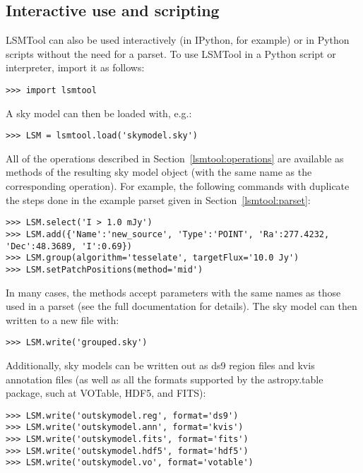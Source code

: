 \documentclass[structabstract]{article}
\begin{document}
\subsection{Interactive use and scripting}
\label{lsmtool:scripting}
LSMTool can also be used interactively (in IPython, for example) or in Python scripts without the need for a parset. To use LSMTool in a Python script or interpreter, import it as follows:
\begin{verbatim}
>>> import lsmtool
\end{verbatim}
A sky model can then be loaded with, e.g.:
\begin{verbatim}
>>> LSM = lsmtool.load('skymodel.sky')
\end{verbatim}
All of the operations described in Section~\ref{lsmtool:operations} are available as methods of the resulting sky model object (with the same name as the corresponding operation). For example, the following commands with duplicate the steps done in the example parset given in Section~\ref{lsmtool:parset}:
\begin{verbatim}
>>> LSM.select('I > 1.0 mJy')
>>> LSM.add({'Name':'new_source', 'Type':'POINT', 'Ra':277.4232, 'Dec':48.3689, 'I':0.69})
>>> LSM.group(algorithm='tesselate', targetFlux='10.0 Jy')
>>> LSM.setPatchPositions(method='mid')
\end{verbatim}
In many cases, the methods accept parameters with the same names as those used in a parset (see the full documentation for details). The sky model can then written to a new file with:
\begin{verbatim}
>>> LSM.write('grouped.sky')
\end{verbatim}
Additionally, sky models can be written out as ds9 region files and kvis annotation files (as well as all the formats supported by the astropy.table package, such at VOTable, HDF5, and FITS):
\begin{verbatim}
>>> LSM.write('outskymodel.reg', format='ds9')
>>> LSM.write('outskymodel.ann', format='kvis')
>>> LSM.write('outskymodel.fits', format='fits')
>>> LSM.write('outskymodel.hdf5', format='hdf5')
>>> LSM.write('outskymodel.vo', format='votable')
\end{verbatim}
\end{document}
